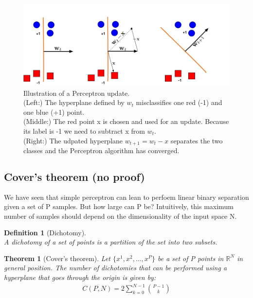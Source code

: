 \documentclass[11pt]{book} %
\newtheorem{theorem}{Theorem}[section]
\newtheorem{definition}{Definition}[section]
\begin{document}
\begin{figure}
    \centering
    \includegraphics[width=\textwidth]{Figs/PerceptronUpdate.png}
    \caption{Illustration of a Perceptron update. \\ 
    (Left:) The hyperplane defined by $w_t$ misclassifies one red (-1) and one blue (+1) point. \\
    (Middle:) The red point x is chosen and used for an update. Because its label is -1 we need to subtract x from $w_t$. \\
    (Right:) The udpated hyperplane $w_{t+1}=w_t-x$ separates the two classes and the Perceptron algorithm has converged.}
    \label{fig:perceptron_learning}
\end{figure}


%
% 

\subsection{Cover's theorem (no proof)}
We have seen that simple perceptron can lean to perfoem linear binary separation given a set of P samples. 
But how large can P be? Intuitively, this maximum number of samples should depend on the dimensionality of the input space N.

\begin{definition}[Dichotomy]\ \\
    A dichotomy of a set of points is a partition of the set into two subsets.
\end{definition}

\begin{theorem}[Cover's theorem]
    Let $\{x^1, x^2, \ldots, x^P\}$ be a set of P points in $\mathbb{R}^N$ in general position. 
    The number of dichotomies that can be performed using a hyperplane that goes through the origin is given by:
    \begin{align}
        C(P,N) = 2 \sum_{k=0}^{N-1} \binom{P-1}{k}
    \end{align}
\end{theorem}
\end{document}
